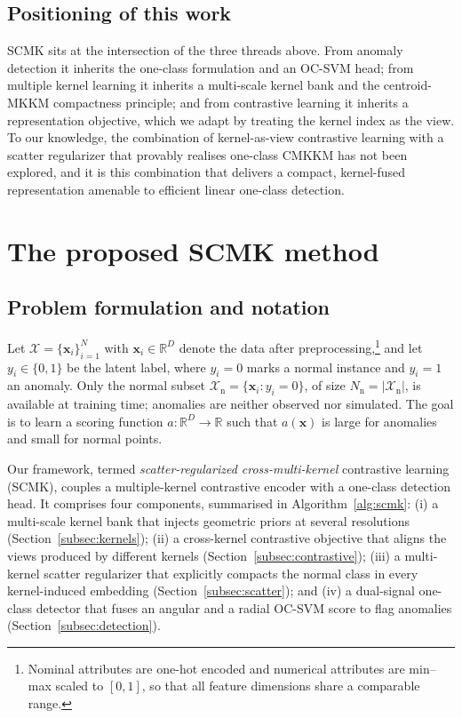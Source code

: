 \documentclass[times, review, 10pt]{elsarticle}
\newcommand{\R}{\mathbb{R}}
\newcommand{\Xnorm}{\mathcal{X}_{\mathrm{n}}}
\newcommand{\xx}{\bm{x}}
\begin{document}
\subsection{Positioning of this work}
\label{subsec:rel-pos}
SCMK sits at the intersection of the three threads above. From anomaly detection
it inherits the one-class formulation and an OC-SVM head; from multiple kernel
learning it inherits a multi-scale kernel bank and the centroid-MKKM compactness
principle; and from contrastive learning it inherits a representation objective,
which we adapt by treating the kernel index as the view. To our knowledge, the
combination of {kernel-as-view} contrastive learning with a scatter
regularizer that provably realises one-class CMKKM has not been explored, and it
is this combination that delivers a compact, kernel-fused representation amenable
to efficient linear one-class detection.

\section{The proposed SCMK method}
\label{sec:method}

\subsection{Problem formulation and notation}
\label{subsec:problem}

Let
$\mathcal{X}=\{\xx_i\}_{i=1}^{N}$ with $\xx_i\in\R^{D}$ denote the data after
preprocessing,\footnote{Nominal attributes are one-hot encoded and numerical
attributes are min--max scaled to $[0,1]$, so that all feature dimensions share
a comparable range.} and let $y_i\in\{0,1\}$ be the latent label, where $y_i=0$
marks a normal instance and $y_i=1$ an anomaly. Only the normal subset
$\Xnorm=\{\xx_i : y_i=0\}$, of size $N_{\mathrm{n}}=|\Xnorm|$, is available at
training time; anomalies are neither observed nor simulated. The goal is to
learn a scoring function $a:\R^{D}\!\to\!\R$ such that $a(\xx)$ is large for
anomalies and small for normal points.

Our framework, termed \emph{scatter-regularized cross-multi-kernel}
contrastive learning (SCMK), couples a multiple-kernel contrastive encoder
with a one-class detection head. It comprises four components, summarised in
Algorithm~\ref{alg:scmk}:
(i) a multi-scale kernel bank that injects geometric priors at several
resolutions (Section~\ref{subsec:kernels});
(ii) a cross-kernel contrastive objective that aligns the views produced by
different kernels (Section~\ref{subsec:contrastive});
(iii) a multi-kernel scatter regularizer that explicitly compacts the normal
class in every kernel-induced embedding (Section~\ref{subsec:scatter}); and
(iv) a dual-signal one-class detector that fuses an angular and a radial OC-SVM
score to flag anomalies (Section~\ref{subsec:detection}).
\end{document}
